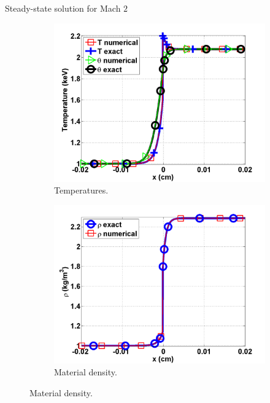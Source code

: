 \documentclass[xcolor=dvipsnames,10pt]{beamer}
\begin{document}
\begin{frame}{Steady-state solution for Mach $2$}
\begin{figure}
\begin{subfigure}[b]{0.35\textwidth}
                \centering
                \includegraphics[width=\textwidth]{../figures/Mach_2_nel_2000_temperature.png}
        \caption{Temperatures.}
\end{subfigure}
\begin{subfigure}[b]{0.35\textwidth}
                \centering
                \includegraphics[width=\textwidth]{../figures/Mach_2_nel_2000_density.png}
        \caption{Material density.}
\end{subfigure}
\end{figure}


\end{frame}
\end{document}
